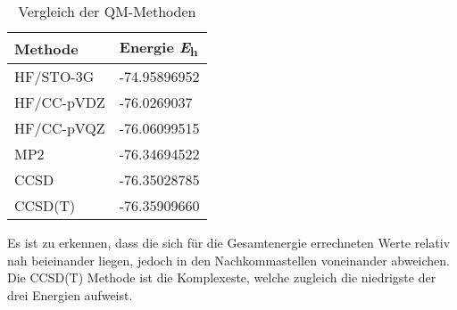 \documentclass[12pt]{article}
\begin{document}
\begin{onehalfspace}
\begin{table}[!htpb]
\centering
\caption{ Vergleich der QM-Methoden}
\begin{tabular}{ll}
\toprule
Methode &   Energie \si{\hartree} \\
\midrule
HF/STO-3G & -74.95896952 \\
HF/CC-pVDZ& -76.0269037\\
HF/CC-pVQZ& -76.06099515\\
MP2 & -76.34694522\\
CCSD & -76.35028785 \\
CCSD(T) & -76.35909660\\
\bottomrule
\end{tabular}
\end{table}
\noindent
Es ist zu erkennen, dass die sich für die Gesamtenergie errechneten Werte relativ nah beieinander liegen, jedoch in den Nachkommastellen voneinander abweichen. Die CCSD(T) Methode ist die Komplexeste, welche zugleich die niedrigste der drei Energien aufweist.
\end{onehalfspace}
\end{document}
